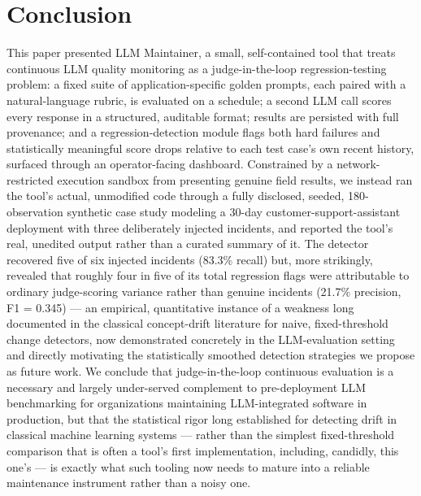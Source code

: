 \documentclass[11pt,a4paper]{article}
\begin{document}
\section{Conclusion}

This paper presented LLM Maintainer, a small, self-contained tool that
treats continuous LLM quality monitoring as a judge-in-the-loop
regression-testing problem: a fixed suite of application-specific golden
prompts, each paired with a natural-language rubric, is evaluated on a
schedule; a second LLM call scores every response in a structured,
auditable format; results are persisted with full provenance; and a
regression-detection module flags both hard failures and statistically
meaningful score drops relative to each test case's own
recent history, surfaced through an operator-facing dashboard.
Constrained by a network-restricted execution sandbox from presenting
genuine field results, we instead ran the tool's actual,
unmodified code through a fully disclosed, seeded, 180-observation
synthetic case study modeling a 30-day customer-support-assistant
deployment with three deliberately injected incidents, and reported the
tool's real, unedited output rather than a curated
summary of it. The detector recovered five of six injected incidents
(83.3\% recall) but, more strikingly, revealed that roughly four in five
of its total regression flags were attributable to ordinary
judge-scoring variance rather than genuine incidents (21.7\% precision,
F1 = 0.345) --- an empirical, quantitative instance of a weakness long
documented in the classical concept-drift literature for naive,
fixed-threshold change detectors, now demonstrated concretely in the
LLM-evaluation setting and directly motivating the statistically
smoothed detection strategies we propose as future work. We conclude
that judge-in-the-loop continuous evaluation is a necessary and largely
under-served complement to pre-deployment LLM benchmarking for
organizations maintaining LLM-integrated software in production, but
that the statistical rigor long established for detecting drift in
classical machine learning systems --- rather than the simplest
fixed-threshold comparison that is often a tool's first
implementation, including, candidly, this one's --- is
exactly what such tooling now needs to mature into a reliable
maintenance instrument rather than a noisy one.
\end{document}
